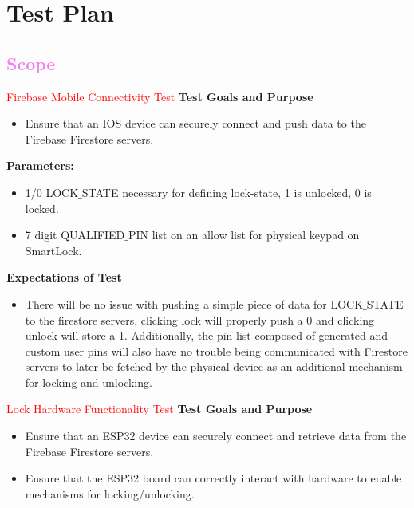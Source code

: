 \section{Test Plan}

\textcolor{violet}{\subsection{Scope}}
\textcolor{red}{Firebase Mobile Connectivity Test}
\newline
\newline
\textbf{Test Goals and Purpose} 
\begin{itemize}
    
    \item Ensure that an IOS device can securely connect and push data to the Firebase Firestore servers.

\end{itemize}
\textbf{Parameters:}
\begin{itemize}

\item 1/0 LOCK$\_$STATE necessary for defining lock-state, 1 is unlocked, 0 is locked.
\item 7 digit QUALIFIED$\_$PIN list on an allow list for physical keypad on SmartLock.

\end{itemize}
\textbf{Expectations of Test}
\begin{itemize}

\item There will be no issue with pushing a simple piece of data for LOCK$\_$STATE to the firestore servers, clicking lock will properly push a 0 and clicking unlock will store a 1. Additionally, the pin list composed of generated and custom user pins will also have no trouble being communicated with Firestore servers to later be fetched by the physical device as an additional mechanism for locking and unlocking.

\end{itemize}
\textcolor{red}{Lock Hardware Functionality Test}
\newline
\newline
\textbf{Test Goals and Purpose}
\begin{itemize}
    \item Ensure that an ESP32 device can securely connect and retrieve data from the Firebase Firestore servers.
    \item Ensure that the ESP32 board can correctly interact with hardware to enable mechanisms for locking/unlocking.
\end{itemize}
